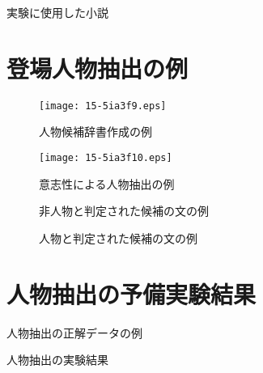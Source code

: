 \documentclass[japanese]{jnlp_1.4}
\begin{document}
  \begin{table}[H]
    \caption{実験に使用した小説}
   \begin{center}

    \end{center} 
  \end{table}


\section{登場人物抽出の例}\label{humanexample}

 \begin{figure}[H]
  \begin{center}
   \texttt{[image: 15-5ia3f9.eps]}
  \end{center}
  \caption{人物候補辞書作成の例}
  \label{ngram2dic}
 \end{figure}
\clearpage

 \begin{figure}[t]
  \begin{center}
   \texttt{[image: 15-5ia3f10.eps]}
  \end{center}
\caption{意志性による人物抽出の例}
  \label{volitional}
 \end{figure}
\begin{figure}[t]

\vspace{-1\baselineskip}
\caption{非人物と判定された候補の文の例}
\label{nonvolexample}
\end{figure}
\begin{figure}[t]

\vspace{-1\baselineskip}
\caption{人物と判定された候補の文の例}
\label{volexample}
\end{figure}


\section{人物抽出の予備実験結果}\label{humexp}

  \begin{table}[H]
   \caption{人物抽出の正解データの例}
   \begin{center}

   \end{center}
  \end{table}

\clearpage

  \begin{table}[H]
   \caption{人物抽出の実験結果}\label{humresult}
   \begin{center}

   \end{center}
  \end{table}
\end{document}
